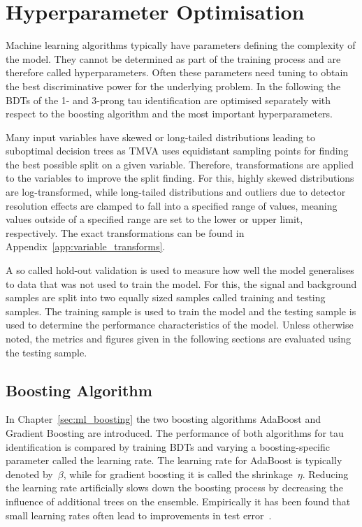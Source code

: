 

\section{Hyperparameter Optimisation}
\label{sec:bdt_hyperparam}

Machine learning algorithms typically have parameters defining the complexity of
the model. They cannot be determined as part of the training process and are
therefore called hyperparameters. Often these parameters need tuning to obtain
the best discriminative power for the underlying problem. In the following the
BDTs of the 1- and 3-prong tau identification are optimised separately with
respect to the boosting algorithm and the most important hyperparameters.

Many input variables have skewed or long-tailed distributions leading to
suboptimal decision trees as TMVA uses equidistant sampling points for finding
the best possible split on a given variable. Therefore, transformations are
applied to the variables to improve the split finding. For this, highly skewed
distributions are log-transformed, while long-tailed distributions and outliers
due to detector resolution effects are clamped to fall into a specified range of
values, meaning values outside of a specified range are set to the lower or
upper limit, respectively. The exact transformations can be found in
Appendix~\ref{app:variable_transforms}.

A so called hold-out validation is used to measure how well the model
generalises to data that was not used to train the model. For this, the signal
and background samples are split into two equally sized samples called training
and testing samples. The training sample is used to train the model and the
testing sample is used to determine the performance characteristics of the
model. Unless otherwise noted, the metrics and figures given in the following
sections are evaluated using the testing sample.

\subsection{Boosting Algorithm}
\label{sec:bdt_boosting}

In Chapter~\ref{sec:ml_boosting} the two boosting algorithms AdaBoost and
Gradient Boosting are introduced. The performance of both algorithms for tau
identification is compared by training BDTs and varying a boosting-specific
parameter called the learning rate. The learning rate for AdaBoost is typically
denoted by~$\beta$, while for gradient boosting it is called the
shrinkage~$\eta$. Reducing the learning rate artificially slows down the
boosting process by decreasing the influence of additional trees on the
ensemble. Empirically it has been found that small learning rates often lead to
improvements in test error~\cite{esl}.

